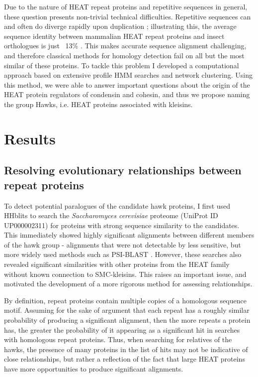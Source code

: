 \documentclass[a4paper,11pt,twoside,openright]{scrbook}
\begin{document}
Due to the nature of HEAT repeat proteins and repetitive sequences in general,
these question presents non-trivial technical difficulties. Repetitive sequences
can and often do diverge rapidly upon duplication \cite{Persi2016}; illustrating
this, the average sequence identity between mammalian HEAT repeat proteins and
insect orthologues is just ~13\% \cite{Andrade2001c}. This makes accurate
sequence alignment challenging, and therefore classical methods for homology
detection fail on all but the most similar of these proteins. To tackle this
problem I developed a computational approach based on extensive profile HMM
searches and network clustering. Using this method, we were able to answer
important questions about the origin of the HEAT protein regulators of condensin
and cohesin, and thus we propose naming the group Hawks, i.e. HEAT proteins
associated with kleisins.

\section{Results}
\subsection{Resolving evolutionary relationships between repeat proteins}
To detect potential paralogues of the candidate hawk proteins, I first used
HHblits \cite{Remmert2011} to search the \textit{Saccharomyces cerevisiae}
proteome (UniProt ID UP000002311) for proteins with strong sequence similarity
to the candidates. This immediately showed highly significant alignments between
different members of the hawk group - alignments that were not detectable by
less sensitive, but more widely used methods such as PSI-BLAST
\cite{Altschul1997}. However, these searches also revealed significant
similarities with other proteins from the HEAT family without known connection
to SMC-kleisins. This raises an important issue, and motivated the development
of a more rigorous method for assessing relationships.

By definition, repeat proteins contain multiple copies of a homologous sequence
motif. Assuming for the sake of argument that each repeat has a roughly similar
probability of producing a significant alignment, then the more repeats a
protein has, the greater the probability of it appearing as a significant hit in
searches with homologous repeat proteins. Thus, when searching for relatives of
the hawks, the presence of many proteins in the list of hits may not be
indicative of close relationships, but rather a reflection of the fact that
large HEAT proteins have more opportunities to produce significant alignments.
\end{document}
